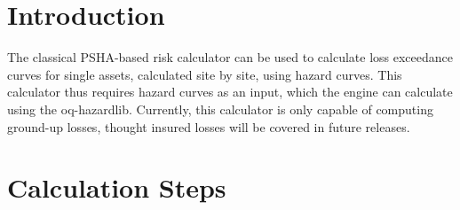 \section{Introduction}
The classical PSHA-based risk calculator can be used to calculate loss exceedance curves for single \glspl{asset}, calculated site by site, using hazard curves. This calculator thus requires hazard curves as an input, which the engine can calculate using the oq-hazardlib. Currently, this calculator is only capable of computing ground-up losses, thought insured losses will be covered in future releases.

\section{Calculation Steps}

